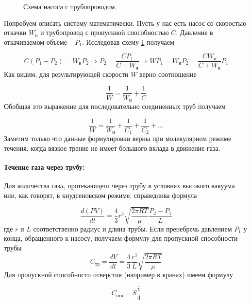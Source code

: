 \documentclass[a4paper, 12pt]{article}
\begin{document}
    \begin{figure}[h]
        \caption{Схема насоса с трубопроводом.}
        \label{ris:nasos_sketch}
    \end{figure}
    Попробуем описать систему математически. Пусть у нас есть насос со скоростью откачки $W_н$ и трубопровод с пропускной способностью $C$. Давление в откачиваемом объеме -- $P_1$. Исследовав схему \ref{ris:nasos_sketch} получаем

    \begin{equation*}
        C(P_1 - P_2)=W_нP_2 \Rightarrow P_2=\frac{CP_1}{C+W_н} \Rightarrow WP_1=W_нP_2=\frac{CW_н}{C+W_н}P_1
    \end{equation*}
    Как видим, для результирующей скорости $W$ верно соотношение

    \begin{equation*}
        \frac{1}{W} = \frac{1}{W_н} + \frac{1}{C}
    \end{equation*}
    Обобщая это выражение для последовательно соединенных труб получаем

    \begin{equation}
        \frac{1}{W} = \frac{1}{W_н} + \frac{1}{C_1} + \frac{1}{C_2} + ...
        \label{resulting_speed}
    \end{equation}
    Заметим только что данные формулировки верны при молекулярном режиме течения, когда вязкое трение не имеет большого вклада в движение газа.

    \paragraph{Течение газа через трубу:} Для количества газa, протекающего через трубу в условиях высокого вакуума или, как говорят, в кнудсеновском режиме, справедлива формула

    \begin{equation}
        \frac{d(PV)}{dt} = \frac{4}{3}r^3 \sqrt{\frac{2\pi RT}{\mu}} \frac{P_2 - P_1}{L}
        \label{prop_spos_truba}
    \end{equation}
    где $r$ и $L$ соответственно радиус и длина трубы. Если пренебречь давлением $P_1$ у конца, обращенного к насосу, получаем формулу для пропускной способности трубы
    \begin{equation}
    C_{тр} = \frac{dV}{dt} = \frac{4}{3}\frac{r^3}{L}\sqrt{\frac{2\pi RT}{\mu}}
    \end{equation}
    Для пропускной способности отверстия (например в кранах) имеем формулу

    \begin{equation}
    C_{отв}=S\frac{\bar v}{4}
    \end{equation}
\end{document}
